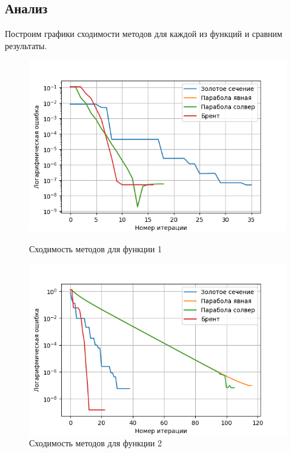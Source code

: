 \documentclass[a4paper,12pt]{article}
\begin{document}
\subsection{Анализ}
Построим графики сходимости методов для каждой из функций и сравним результаты.
\begin{figure}[H]
    \begin{minipage}{0.49\textwidth}
                \centering \includegraphics[width=\textwidth]{images/task1/f1.png}
        \caption{Сходимость методов для функции 1}
    \end{minipage}\hfill
    \begin{minipage}{0.49\textwidth}
        \centering \includegraphics[width=\textwidth]{images/task1/f2.png}
        \caption{Сходимость методов для функции 2}
    \end{minipage}
\end{figure}
\end{document}
